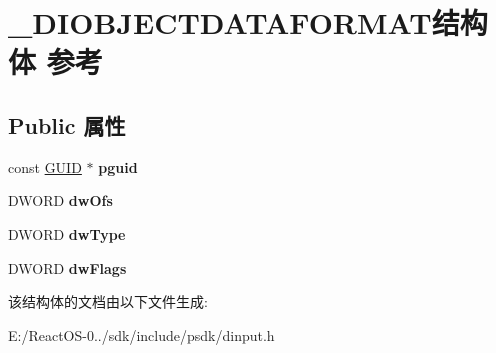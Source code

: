 \hypertarget{struct___d_i_o_b_j_e_c_t_d_a_t_a_f_o_r_m_a_t}{}\section{\+\_\+\+D\+I\+O\+B\+J\+E\+C\+T\+D\+A\+T\+A\+F\+O\+R\+M\+A\+T结构体 参考}
\label{struct___d_i_o_b_j_e_c_t_d_a_t_a_f_o_r_m_a_t}
\subsection*{Public 属性}
\begin{DoxyCompactItemize}
\item 
\mbox{\label{struct___d_i_o_b_j_e_c_t_d_a_t_a_f_o_r_m_a_t_a1e45387fa97b685a690094aebbe12472}} 
const \hyperlink{interface_g_u_i_d}{G\+U\+ID} $\ast$ {\bfseries pguid}
\item 
\mbox{\label{struct___d_i_o_b_j_e_c_t_d_a_t_a_f_o_r_m_a_t_ad77e64009941d9461f4bad55fccd174f}} 
D\+W\+O\+RD {\bfseries dw\+Ofs}
\item 
\mbox{\label{struct___d_i_o_b_j_e_c_t_d_a_t_a_f_o_r_m_a_t_a596ebf90f7f79d66c4a8e6a2da77fb04}} 
D\+W\+O\+RD {\bfseries dw\+Type}
\item 
\mbox{\label{struct___d_i_o_b_j_e_c_t_d_a_t_a_f_o_r_m_a_t_a5f31989c6f7b1b6b699434edbd0038be}} 
D\+W\+O\+RD {\bfseries dw\+Flags}
\end{DoxyCompactItemize}


该结构体的文档由以下文件生成\+:\begin{DoxyCompactItemize}
\item 
E\+:/\+React\+O\+S-\/0../sdk/include/psdk/dinput.\+h\end{DoxyCompactItemize}
